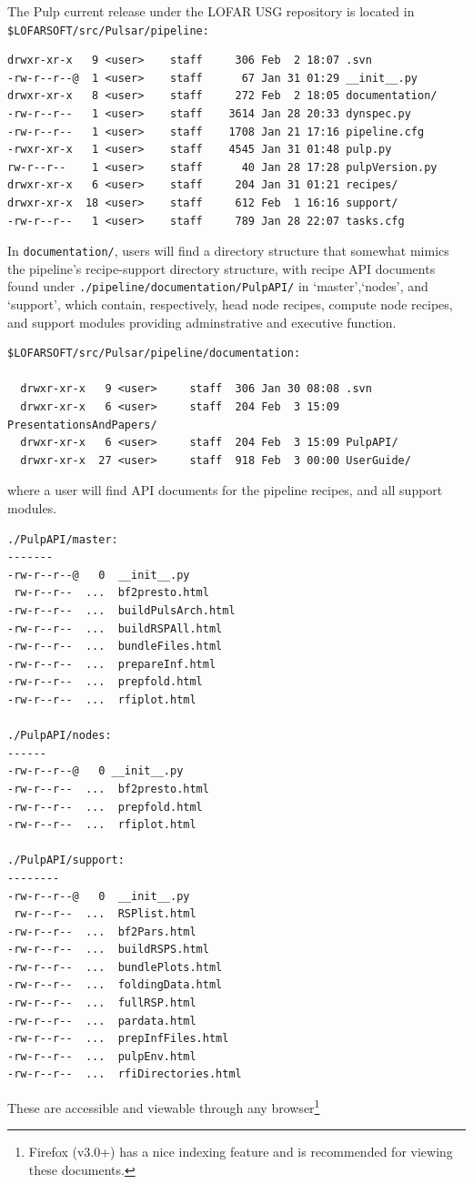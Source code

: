 \documentclass[a4paper,10pt,bibtotoc]{scrartcl}
\begin{document}
The Pulp current release under the LOFAR USG repository is located in \\
\noindent \verb|$LOFARSOFT/src/Pulsar/pipeline:|
\begin{verbatim}
drwxr-xr-x   9 <user>    staff     306 Feb  2 18:07 .svn 
-rw-r--r--@  1 <user>    staff      67 Jan 31 01:29 __init__.py
drwxr-xr-x   8 <user>    staff     272 Feb  2 18:05 documentation/
-rw-r--r--   1 <user>    staff    3614 Jan 28 20:33 dynspec.py
-rw-r--r--   1 <user>    staff    1708 Jan 21 17:16 pipeline.cfg
-rwxr-xr-x   1 <user>    staff    4545 Jan 31 01:48 pulp.py
rw-r--r--    1 <user>    staff      40 Jan 28 17:28 pulpVersion.py
drwxr-xr-x   6 <user>    staff     204 Jan 31 01:21 recipes/
drwxr-xr-x  18 <user>    staff     612 Feb  1 16:16 support/
-rw-r--r--   1 <user>    staff     789 Jan 28 22:07 tasks.cfg
\end{verbatim}
In \verb|documentation/|, users will  find a directory structure that
somewhat mimics the pipeline's recipe-support directory structure, with
recipe API documents found under
\verb|./pipeline/documentation/PulpAPI/| in
`master',`nodes', and `support', which contain, respectively, head
node recipes, compute node recipes, and support modules providing adminstrative and
executive function.
\begin{verbatim}
$LOFARSOFT/src/Pulsar/pipeline/documentation:

  drwxr-xr-x   9 <user>     staff  306 Jan 30 08:08 .svn
  drwxr-xr-x   6 <user>     staff  204 Feb  3 15:09 PresentationsAndPapers/
  drwxr-xr-x   6 <user>     staff  204 Feb  3 15:09 PulpAPI/
  drwxr-xr-x  27 <user>     staff  918 Feb  3 00:00 UserGuide/
\end{verbatim}
where a user will find API documents for the pipeline recipes, and all support
modules.\\
\begin{verbatim}
./PulpAPI/master:
-------
-rw-r--r--@   0  __init__.py
 rw-r--r--  ...  bf2presto.html
-rw-r--r--  ...  buildPulsArch.html
-rw-r--r--  ...  buildRSPAll.html
-rw-r--r--  ...  bundleFiles.html
-rw-r--r--  ...  prepareInf.html
-rw-r--r--  ...  prepfold.html
-rw-r--r--  ...  rfiplot.html

./PulpAPI/nodes:
------
-rw-r--r--@   0 __init__.py
-rw-r--r--  ...  bf2presto.html
-rw-r--r--  ...  prepfold.html
-rw-r--r--  ...  rfiplot.html

./PulpAPI/support:
--------
-rw-r--r--@   0  __init__.py
 rw-r--r--  ...  RSPlist.html
-rw-r--r--  ...  bf2Pars.html
-rw-r--r--  ...  buildRSPS.html
-rw-r--r--  ...  bundlePlots.html
-rw-r--r--  ...  foldingData.html
-rw-r--r--  ...  fullRSP.html
-rw-r--r--  ...  pardata.html
-rw-r--r--  ...  prepInfFiles.html
-rw-r--r--  ...  pulpEnv.html
-rw-r--r--  ...  rfiDirectories.html
\end{verbatim}
These are accessible and viewable through any browser\footnote{Firefox (v3.0+)
  has a nice indexing feature and is recommended for viewing these
  documents. }
\end{document}

